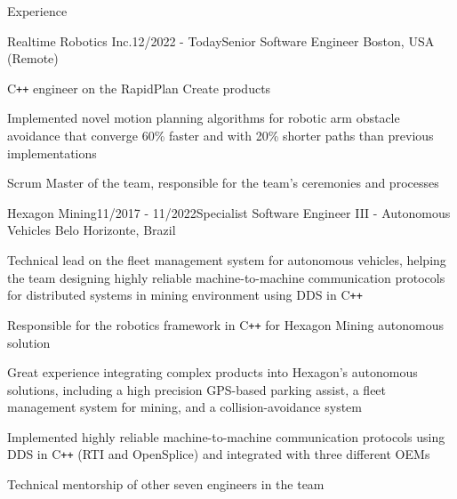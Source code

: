 \documentclass[12pt, a4paper]{resume} %
\begin{document}
\begin{rSection}{Experience}

	\begin{rSubsection}{Realtime Robotics Inc.}{12/2022 - Today}{\normalfont Senior Software Engineer}{ \normalfont Boston, USA (Remote)}
		\item C\texttt{++} engineer on the RapidPlan Create products
		\item Implemented novel motion planning algorithms for robotic arm obstacle avoidance that converge 60\% faster and with 20\% shorter paths than previous implementations
		\item Scrum Master of the team, responsible for the team's ceremonies and processes
	\end{rSubsection}

	\begin{rSubsection}{Hexagon Mining}{11/2017 - 11/2022}{\normalfont Specialist Software Engineer III - Autonomous Vehicles}{ \normalfont Belo Horizonte, Brazil}
		\item Technical lead on the fleet management system for autonomous vehicles, helping the team designing highly reliable machine-to-machine communication protocols for distributed systems in mining environment using DDS in C\texttt{++}
		\item Responsible for the robotics framework in C\texttt{++} for Hexagon Mining autonomous solution
		\item Great experience integrating complex products into Hexagon's autonomous solutions, including a high precision GPS-based parking assist, a fleet management system for mining, and a collision-avoidance system
		\item Implemented highly reliable machine-to-machine communication protocols using DDS in C\texttt{++} (RTI and OpenSplice) and integrated with three different OEMs
		\item Technical mentorship of other seven engineers in the team

	\end{rSubsection}




\end{rSection}
\end{document}
